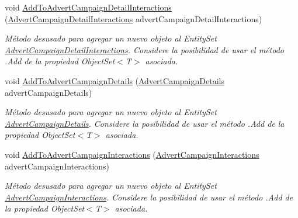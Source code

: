 \begin{DoxyCompactItemize}
void \hyperlink{class_microsoft_1_1_samples_1_1_kinect_1_1_basic_interactions_1_1_o_m_k_t_d_b_entities_a4fc8fdaedfd733f2d22d4d145fff6799}{Add\-To\-Advert\-Campaign\-Detail\-Interactions} (\hyperlink{class_microsoft_1_1_samples_1_1_kinect_1_1_basic_interactions_1_1_advert_campaign_detail_interactions}{Advert\-Campaign\-Detail\-Interactions} advert\-Campaign\-Detail\-Interactions)
\begin{DoxyCompactList}\small\item\em Método desusado para agregar un nuevo objeto al Entity\-Set \hyperlink{class_microsoft_1_1_samples_1_1_kinect_1_1_basic_interactions_1_1_advert_campaign_detail_interactions}{Advert\-Campaign\-Detail\-Interactions}. Considere la posibilidad de usar el método .Add de la propiedad Object\-Set$<$T$>$ asociada. \end{DoxyCompactList}\item 
void \hyperlink{class_microsoft_1_1_samples_1_1_kinect_1_1_basic_interactions_1_1_o_m_k_t_d_b_entities_a7303b84b7274c1ece5ece175fa05bcaa}{Add\-To\-Advert\-Campaign\-Details} (\hyperlink{class_microsoft_1_1_samples_1_1_kinect_1_1_basic_interactions_1_1_advert_campaign_details}{Advert\-Campaign\-Details} advert\-Campaign\-Details)
\begin{DoxyCompactList}\small\item\em Método desusado para agregar un nuevo objeto al Entity\-Set \hyperlink{class_microsoft_1_1_samples_1_1_kinect_1_1_basic_interactions_1_1_advert_campaign_details}{Advert\-Campaign\-Details}. Considere la posibilidad de usar el método .Add de la propiedad Object\-Set$<$T$>$ asociada. \end{DoxyCompactList}\item 
void \hyperlink{class_microsoft_1_1_samples_1_1_kinect_1_1_basic_interactions_1_1_o_m_k_t_d_b_entities_a7e3e31f01a6ae91cb9eff01782cd0178}{Add\-To\-Advert\-Campaign\-Interactions} (\hyperlink{class_microsoft_1_1_samples_1_1_kinect_1_1_basic_interactions_1_1_advert_campaign_interactions}{Advert\-Campaign\-Interactions} advert\-Campaign\-Interactions)
\begin{DoxyCompactList}\small\item\em Método desusado para agregar un nuevo objeto al Entity\-Set \hyperlink{class_microsoft_1_1_samples_1_1_kinect_1_1_basic_interactions_1_1_advert_campaign_interactions}{Advert\-Campaign\-Interactions}. Considere la posibilidad de usar el método .Add de la propiedad Object\-Set$<$T$>$ asociada. \end{DoxyCompactList}\item 

\end{DoxyCompactItemize}
